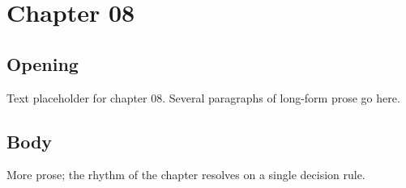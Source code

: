 \chapter{Chapter 08}
\section{Opening}
Text placeholder for chapter 08. Several paragraphs of long-form prose go here.
\section{Body}
More prose; the rhythm of the chapter resolves on a single decision rule.
